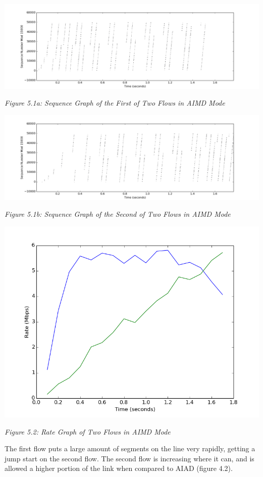\documentclass[11pt]{article}
\begin{document}
\includegraphics[width=17cm]{outputs/AIMD/AIMD_sequence1000.png}

\centerline{\emph{Figure 5.1a: Sequence Graph of the First of Two Flows in AIMD Mode}}

\includegraphics[width=17cm]{outputs/AIMD/AIMD_sequence2000.png}

\centerline{\emph{Figure 5.1b: Sequence Graph of the Second of Two Flows in AIMD Mode}}


\includegraphics[width=17cm]{outputs/AIMD/AIMD_rate.png}

\centerline{\emph{Figure 5.2: Rate Graph of Two Flows in AIMD Mode}}

The first flow puts a large amount of segments on the line very rapidly, getting a jump start on the second flow. The second flow is increasing where it can, and is allowed a higher portion of the link when compared to AIAD (figure 4.2). 
\end{document}
